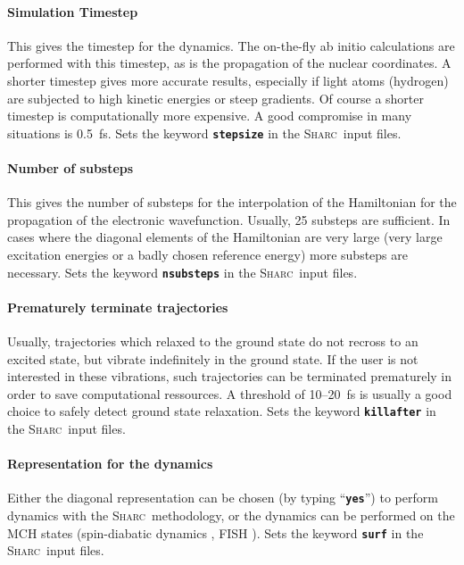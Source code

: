 \documentclass[a4paper,11pt,DIV=15,openany,twoside=false]{scrbook}
\newcommand{\sharc}{\textsc{Sharc}}
\newcommand{\ttt}[1]{\textbf{\texttt{#1}}}
\begin{document}
\paragraph{Simulation Timestep}

This gives the timestep for the dynamics. The on-the-fly ab initio calculations are performed with this timestep, as is the propagation of the nuclear coordinates. A shorter timestep gives more accurate results, especially if light atoms (hydrogen) are subjected to high kinetic energies or steep gradients. Of course a shorter timestep is computationally more expensive. A good compromise in many situations is 0.5~fs. Sets the keyword \ttt{stepsize} in the \sharc\ input files.

\paragraph{Number of substeps}

This gives the number of substeps for the interpolation of the Hamiltonian for the propagation of the electronic wavefunction. Usually, 25 substeps are sufficient. In cases where the diagonal elements of the Hamiltonian are very large (very large excitation energies or a badly chosen reference energy) more substeps are necessary. Sets the keyword \ttt{nsubsteps} in the \sharc\ input files.

\paragraph{Prematurely terminate trajectories}

Usually, trajectories which relaxed to the ground state do not recross to an excited state, but vibrate indefinitely in the ground state. If the user is not interested in these vibrations, such trajectories can be terminated prematurely in order to save computational ressources. A threshold of 10--20~fs is usually a good choice to safely detect ground state relaxation. Sets the keyword \ttt{killafter} in the \sharc\ input files.

\paragraph{Representation for the dynamics}

Either the diagonal representation can be chosen (by typing ``\ttt{yes}'') to perform dynamics with the \sharc\ methodology, or the dynamics can be performed on the MCH states (spin-diabatic dynamics \cite{Granucci2012JCP}, FISH \cite{Mitric2009PRA}). Sets the keyword \ttt{surf} in the \sharc\ input files.
\end{document}
